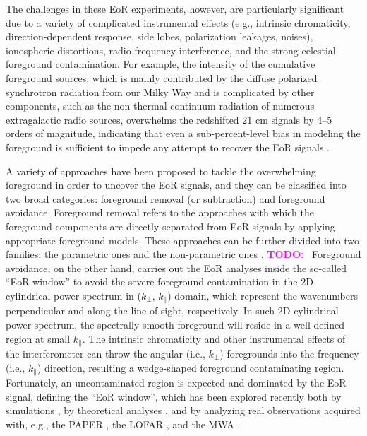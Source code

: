 \documentclass[modern]{aastex61}
\newcommand{\klos}{$k_{\parallel}$}
\newcommand{\kperp}{$k_{\bot}$}
\newcommand{\TODO}[1]{\textcolor{magenta}{\textbf{TODO:}}~\uuline{#1}}
\begin{document}
The challenges in these EoR experiments, however, are particularly
significant due to a variety of complicated instrumental effects
(e.g., intrinsic chromaticity, direction-dependent response, side lobes,
polarization leakages, noises), ionospheric distortions, radio frequency
interference, and the strong celestial foreground contamination.
For example, the intensity of the cumulative foreground sources, which
is mainly contributed by the diffuse polarized synchrotron radiation from
our Milky Way and is complicated by other components, such as the
non-thermal continuum radiation of numerous extragalactic radio sources,
overwhelms the redshifted 21 cm signals by \numrange{4}{5} orders of
magnitude, indicating that even a sub-percent-level bias in modeling
the foreground is sufficient to impede any attempt to recover the EoR
signals \citep[e.g.,][]{beardsley2016,murray2017,procopio2017}.

A variety of approaches have been proposed to tackle the overwhelming
foreground in order to uncover the EoR signals, and they can be classified
into two broad categories: foreground removal (or subtraction) and
foreground avoidance.
Foreground removal refers to the approaches with which the foreground
components are directly separated from EoR signals by applying appropriate
foreground models.
These approaches can be further divided into two families:
the parametric ones \citep[e.g.,][]{wang2006,jelic2008,liu2009,wang2013}
and the non-parametric ones
\citep[e.g.,][]{harker2009,wang2010,chapman2012,chapman2013,gu2013}.
\TODO{[needs improve]}
Foreground avoidance, on the other hand, carries out the EoR analyses
inside the so-called ``EoR window'' to avoid the severe foreground
contamination in the 2D cylindrical power spectrum in (\kperp, \klos)
domain, which represent the wavenumbers perpendicular and along the
line of sight, respectively.
In such 2D cylindrical power spectrum, the spectrally smooth foreground
will reside in a well-defined region at small \klos.
The intrinsic chromaticity and other instrumental effects of the
interferometer can throw the angular (i.e., \kperp) foregrounds into
the frequency (i.e., \klos) direction, resulting a wedge-shaped foreground
contaminating region.
Fortunately, an uncontaminated region is expected and dominated by the
EoR signal, defining the ``EoR window'', which has been explored recently
both by simulations
\citep[e.g.,][]{datta2010,thyagarajan2013,thyagarajan2015,barry2016},
by theoretical analyses \citep[e.g.,][]{morales2012,hazelton2013,liu2014},
and by analyzing real observations acquired with, e.g.,
the PAPER \citep{pober2013,ali2015},
the LOFAR \citep{patil2017},
and the MWA \citep{dillon2015,beardsley2016,procopio2017}.
\end{document}
